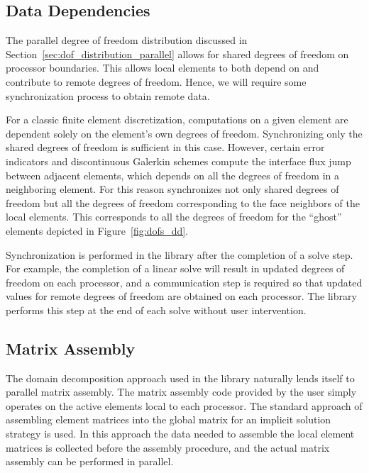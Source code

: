 \subsection{Data Dependencies}
The parallel degree of freedom distribution discussed in
Section~\ref{sec:dof_distribution_parallel} allows for shared degrees of
freedom on processor boundaries.  This allows local elements to
both depend on and contribute to remote degrees of freedom.  Hence, we will 
require some synchronization process to obtain remote
data.

For a classic finite element discretization, computations on a given
element are dependent solely on the element's own degrees of freedom.  
Synchronizing only the shared degrees of freedom is sufficient in this
case.  However, certain error indicators and discontinuous Galerkin
schemes compute the interface flux jump between adjacent elements, which depends on all the
degrees of freedom in a neighboring element.  For this reason
\libMesh{}
synchronizes not only shared degrees of freedom but all the
degrees of freedom corresponding to the face neighbors of the local
elements.  This corresponds to all the degrees of freedom for the
``ghost'' elements depicted in Figure~\ref{fig:dofs_dd}.

Synchronization is performed in the library after the completion of a
solve step.  For example, the completion of a linear solve will result
in updated degrees of freedom on each processor, and a communication
step is required so that updated values for remote degrees of freedom
are obtained on each processor.  The library performs this step at the end of each solve
without user intervention.

\subsection{Matrix Assembly}
The domain decomposition approach used in the library naturally lends
itself to parallel matrix assembly. The matrix assembly code provided
by the user simply operates on the active elements local to each
processor.  The standard approach of assembling element matrices into
the global matrix for an implicit solution strategy is used.  In this
approach the data needed to assemble the local element matrices is
collected before the assembly procedure, and the actual matrix
assembly can be performed in parallel.


